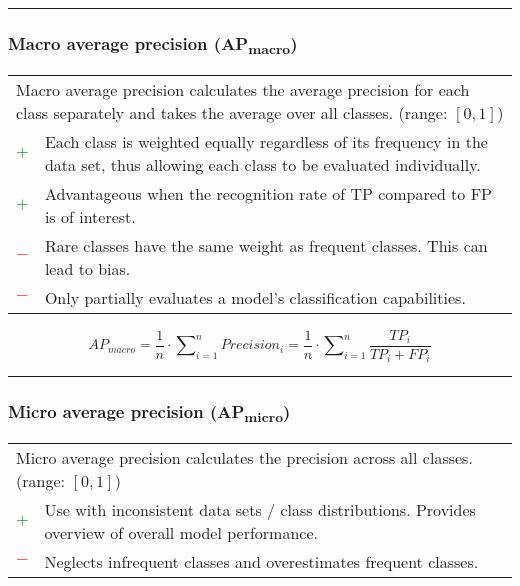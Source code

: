 \documentclass{article}
\begin{document}
\hrule


\subsubsection[Macro average precision (APmacro)]{Macro average precision (AP\textsubscript{macro}) \cite{yang1999evaluation, sebastiani2002machine, zhu2004recall, he2018local}}

\begin{table}[H]\centering
	\begin{tabular}{m{}m{}}
		\multicolumn{2}{m{0.95\textwidth}}{Macro average precision calculates the average precision for each class separately and takes the average over all classes. (range: $[0, 1]$)} \\
		\textcolor{Green}{$+$} & Each class is weighted equally regardless of its frequency in the data set, thus allowing each class to be evaluated individually. \\
		\textcolor{Green}{$+$} & Advantageous when the recognition rate of TP compared to FP is of interest. \\
		\textcolor{Red}{$-$}   & Rare classes have the same weight as frequent classes. This can lead to bias. \\
		\textcolor{Red}{$-$}   & Only partially evaluates a model's classification capabilities.
	\end{tabular}
\end{table}

\begin{equation}
	\textit{AP}_\textit{macro} = \dfrac{1}{n} \cdot \sum\nolimits_{i = 1}^n \textit{Precision}_i = \dfrac{1}{n} \cdot \sum\nolimits_{i = 1}^n \dfrac{\textit{TP}_i}{\textit{TP}_i + \textit{FP}_i}
%
	\label{equation:MAAP}
\end{equation}

\hrule


\subsubsection[Micro average precision (APmicro)]{Micro average precision (AP\textsubscript{micro}) \cite{yang1999evaluation, sebastiani2002machine}}

\begin{table}[H]\centering
	\begin{tabular}{m{}m{}}
		\multicolumn{2}{m{0.95\textwidth}}{Micro average precision calculates the precision across all classes. (range: $[0, 1]$)} \\
		\textcolor{Green}{$+$} & Use with inconsistent data sets / class distributions. Provides overview of overall model performance. \\
		\textcolor{Red}{$-$}   & Neglects infrequent classes and overestimates frequent classes.
	\end{tabular}
\end{table}
\end{document}
